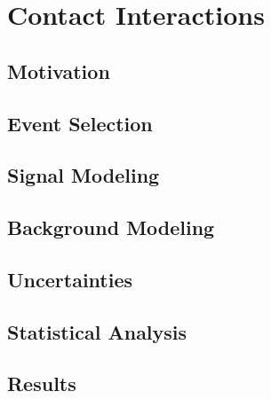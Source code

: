 \chapter{Contact Interactions}

\section{Motivation}
\section{Event Selection}
\section{Signal Modeling}
\section{Background Modeling}
\section{Uncertainties}
\section{Statistical Analysis}
\section{Results}
